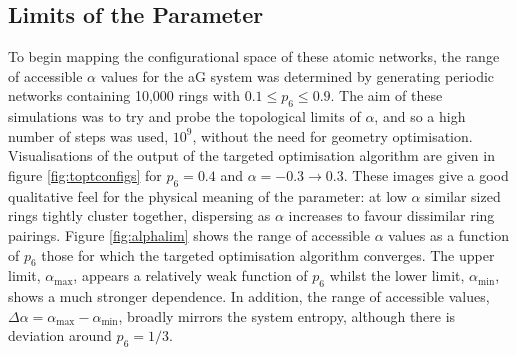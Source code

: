 \subsection{Limits of the \aw{} Parameter}

To begin mapping the configurational space of these atomic networks, the range of accessible $\alpha$ values for the aG system was determined by generating periodic networks containing 10,000 rings with $0.1\leq p_6 \leq 0.9$. 
The aim of these simulations was to try and probe the topological limits of $\alpha$, and so a high number of \mc{} steps was used, $10^{9}$, without the need for geometry optimisation.
Visualisations of the output of the targeted optimisation algorithm are given in figure \ref{fig:toptconfigs} for $p_6=0.4$ and $\alpha=-0.3\rightarrow 0.3$.
These images give a good qualitative feel for the physical meaning of the \aw{} parameter: at low $\alpha$ similar sized rings tightly cluster together, dispersing as $\alpha$ increases to favour dissimilar ring pairings.
Figure \ref{fig:alphalim} shows the range of accessible $\alpha$ values
as a function of $p_6$ \ie{} those for which the targeted optimisation algorithm converges.
The upper limit, $\alpha_{\mathrm{max}}$, appears a relatively weak function of $p_6$ whilst the lower limit, $\alpha_{\mathrm{min}}$, shows a much
stronger dependence.
In addition, the range of accessible values, $\Delta\alpha=\alpha_{\mathrm{max}}-\alpha_{\mathrm{min}}$, broadly mirrors the system entropy, although there is deviation around $p_6=1/3$.

